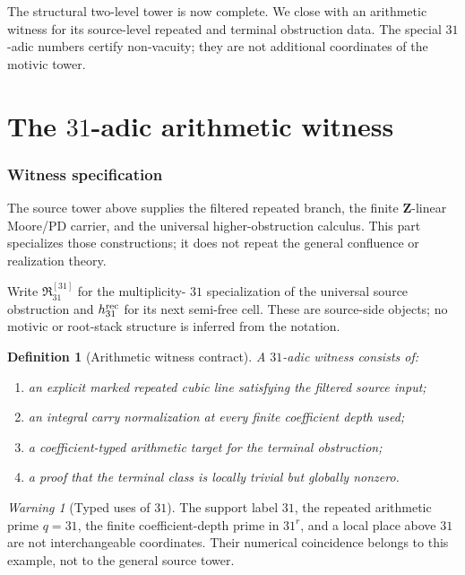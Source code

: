 \documentclass[11pt]{article}
\newtheorem{definition}[theorem]{Definition}
\theoremstyle{remark}
\newtheorem{warning}[theorem]{Warning}
\begin{document}
\medskip
The structural two-level tower is now complete.  We close with an arithmetic
witness for its source-level repeated and terminal obstruction data.  The
special \(31\)-adic numbers certify non-vacuity; they are not additional
coordinates of the motivic tower.

\part{The \(31\)-adic arithmetic witness}

\section{Witness specification}
\label{sec:paper1-interface-contract}
The source tower above supplies the filtered repeated branch, the finite
\(\mathbf Z\)-linear Moore/PD carrier, and the universal higher-obstruction
calculus.  This part specializes those constructions; it does not repeat the
general confluence or realization theory.

Write \(\mathfrak R_{31}^{[31]}\) for the multiplicity-
\(31\) specialization of the universal source obstruction and
\(h_{31}^{\rm rec}\) for its next semi-free cell.  These are source-side
objects; no motivic or root-stack structure is inferred from the notation.

\begin{definition}[Arithmetic witness contract]\label{def:paper1-witness-contract}
A \(31\)-adic witness consists of:
\begin{enumerate}[label=\textup{(W\arabic*)}]
\item an explicit marked repeated cubic line satisfying the filtered source input;
\item an integral carry normalization at every finite coefficient depth used;
\item a coefficient-typed arithmetic target for the terminal obstruction;
\item a proof that the terminal class is locally trivial but globally nonzero.
\end{enumerate}
\end{definition}

\begin{warning}[Typed uses of \(31\)]\label{warn:typed-31-coordinates}
The support label \(31\), the repeated arithmetic prime \(q=31\), the finite
coefficient-depth prime in \(31^r\), and a local place above \(31\) are not
interchangeable coordinates.  Their numerical coincidence belongs to this
example, not to the general source tower.
\end{warning}
\end{document}
